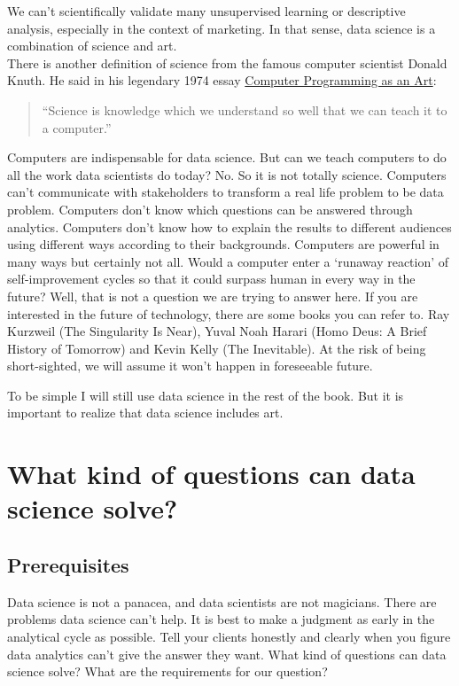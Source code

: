 \documentclass[]{book}
\theoremstyle{definition}
\theoremstyle{definition}
\theoremstyle{remark}
\begin{document}
We can't scientifically validate many unsupervised learning or
descriptive analysis, especially in the context of marketing. In that
sense, data science is a combination of science and art.\\
There is another definition of science from the famous computer
scientist Donald Knuth. He said in his legendary 1974 essay
\href{http://www.paulgraham.com/knuth.html}{Computer Programming as an
Art}:

\begin{quote}
``Science is knowledge which we understand so well that we can teach it
to a computer.''
\end{quote}

Computers are indispensable for data science. But can we teach computers
to do all the work data scientists do today? No. So it is not totally
science. Computers can't communicate with stakeholders to transform a
real life problem to be data problem. Computers don't know which
questions can be answered through analytics. Computers don't know how to
explain the results to different audiences using different ways
according to their backgrounds. Computers are powerful in many ways but
certainly not all. Would a computer enter a `runaway reaction' of
self-improvement cycles so that it could surpass human in every way in
the future? Well, that is not a question we are trying to answer here.
If you are interested in the future of technology, there are some books
you can refer to. Ray Kurzweil (The Singularity Is Near), Yuval Noah
Harari (Homo Deus: A Brief History of Tomorrow) and Kevin Kelly (The
Inevitable). At the risk of being short-sighted, we will assume it won't
happen in foreseeable future.

To be simple I will still use data science in the rest of the book. But
it is important to realize that data science includes art.

\section{What kind of questions can data science
solve?}\label{what-kind-of-questions-can-data-science-solve}

\subsection{Prerequisites}\label{prerequisites}

Data science is not a panacea, and data scientists are not magicians.
There are problems data science can't help. It is best to make a
judgment as early in the analytical cycle as possible. Tell your clients
honestly and clearly when you figure data analytics can't give the
answer they want. What kind of questions can data science solve? What
are the requirements for our question?
\end{document}
